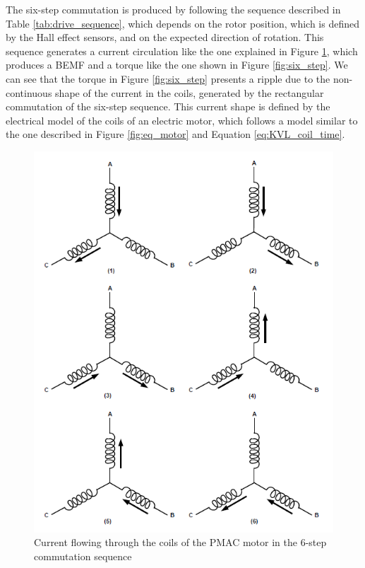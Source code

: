 The six-step commutation is produced by following the sequence described in Table \ref{tab:drive_sequence}, which depends on the rotor position, which is defined by the Hall effect sensors, and on the expected direction of rotation. This sequence generates a current circulation like the one explained in Figure \ref{fig:six_step_coils}, which produces a \ac{BEMF} and a torque like the one shown in Figure \ref{fig:six_step}. We can see that the torque in Figure \ref{fig:six_step} presents a ripple due to the non-continuous shape of the current in the coils, generated by the rectangular commutation of the six-step sequence. This current shape is defined by the electrical model of the coils of an electric motor, which follows a model similar to the one described in Figure \ref{fig:eq_motor} and Equation \ref{eq:KVL_coil_time}.

\begin{figure}[htbp]
\centering
\includegraphics[width=\textwidth]{Images/6step_coils.png} 
\caption[Six Step Commutation Currents]{Current flowing through the coils of the PMAC motor in the 6-step commutation sequence}
\label{fig:six_step_coils}
\end{figure}

